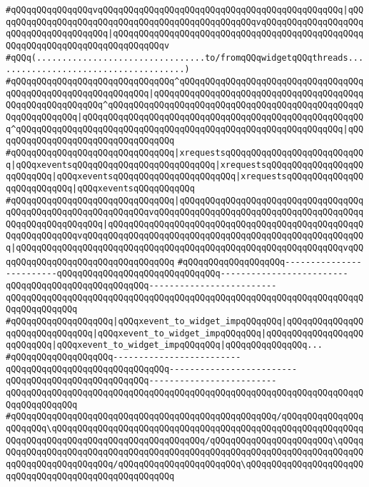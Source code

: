 \verb|#qQQqqQQqqQQqqQQqvqQQqqQQqqQQqqQQqqQQqqQQqqQQqqQQqqQQqqQQqqQQqqQQq|\verb#|qQQqqQQqqQQqqQQqqQQqqQQqqQQqqQQqqQQqqQQqqQQqqQQqqQQqvqQQqqQQqqQQqqQQqqQQqqQQqqQQqqQQqqQQqqQQq|qQQqqQQqqQQqqQQqqQQqqQQqqQQqqQQqqQQqqQQqqQQqqQQqqQQqqQQqqQQqqQQqqQQqqQQqqQQqqQQqv#\newline
\verb|#qQQq(.................................to/fromqQQqwidgetqQQqthreads......................................)|\newline
\verb|#qQQqqQQqqQQqqQQqqQQqqQQqqQQqqQQq^qQQqqQQqqQQqqQQqqQQqqQQqqQQqqQQqqQQqqQQqqQQqqQQqqQQqqQQqqQQqqQQq|\verb#|qQQqqQQqqQQqqQQqqQQqqQQqqQQqqQQqqQQqqQQqqQQqqQQqqQQqqQQqqQQq^qQQqqQQqqQQqqQQqqQQqqQQqqQQqqQQqqQQqqQQqqQQqqQQqqQQqqQQqqQQqqQQq|qQQqqQQqqQQqqQQqqQQqqQQqqQQqqQQqqQQqqQQqqQQqqQQqqQQqqQQq^qQQqqQQqqQQqqQQqqQQqqQQqqQQqqQQqqQQqqQQqqQQqqQQqqQQqqQQqqQQqqQQq|qQQqqQQqqQQqqQQqqQQqqQQqqQQqqQQqqQQq#\newline
\verb|#qQQqqQQqqQQqqQQqqQQqqQQqqQQqqQQq|\verb#|xrequestsqQQqqQQqqQQqqQQqqQQqqQQqqQQq|qQQqxeventsqQQqqQQqqQQqqQQqqQQqqQQqqQQq|xrequestsqQQqqQQqqQQqqQQqqQQqqQQqqQQq|qQQqxeventsqQQqqQQqqQQqqQQqqQQqqQQq|xrequestsqQQqqQQqqQQqqQQqqQQqqQQqqQQq|qQQqxeventsqQQqqQQqqQQq#\newline
\verb|#qQQqqQQqqQQqqQQqqQQqqQQqqQQqqQQq|\verb#|qQQqqQQqqQQqqQQqqQQqqQQqqQQqqQQqqQQqqQQqqQQqqQQqqQQqqQQqqQQqqQQqvqQQqqQQqqQQqqQQqqQQqqQQqqQQqqQQqqQQqqQQqqQQqqQQqqQQqqQQqqQQq|qQQqqQQqqQQqqQQqqQQqqQQqqQQqqQQqqQQqqQQqqQQqqQQqqQQqqQQqqQQqqQQqvqQQqqQQqqQQqqQQqqQQqqQQqqQQqqQQqqQQqqQQqqQQqqQQqqQQqqQQq|qQQqqQQqqQQqqQQqqQQqqQQqqQQqqQQqqQQqqQQqqQQqqQQqqQQqqQQqqQQqqQQqvqQQqqQQqqQQqqQQqqQQqqQQqqQQqqQQqqQQq#\newline
\verb|#qQQqqQQqqQQqqQQqqQQq-------------------------qQQqqQQqqQQqqQQqqQQqqQQqqQQqqQQq-------------------------qQQqqQQqqQQqqQQqqQQqqQQqqQQq-------------------------qQQqqQQqqQQqqQQqqQQqqQQqqQQqqQQqqQQqqQQqqQQqqQQqqQQqqQQqqQQqqQQqqQQqqQQqqQQqqQQqqQQq|\newline
\verb|#qQQqqQQqqQQqqQQqqQQq|\verb#|qQQqxevent_to_widget_impqQQqqQQq|qQQqqQQqqQQqqQQqqQQqqQQqqQQqqQQq|qQQqxevent_to_widget_impqQQqqQQq|qQQqqQQqqQQqqQQqqQQqqQQqqQQq|qQQqxevent_to_widget_impqQQqqQQq|qQQqqQQqqQQqqQQq...#\newline
\verb|#qQQqqQQqqQQqqQQqqQQq-------------------------qQQqqQQqqQQqqQQqqQQqqQQqqQQqqQQq-------------------------qQQqqQQqqQQqqQQqqQQqqQQqqQQq-------------------------qQQqqQQqqQQqqQQqqQQqqQQqqQQqqQQqqQQqqQQqqQQqqQQqqQQqqQQqqQQqqQQqqQQqqQQqqQQqqQQqqQQq|\newline
\verb|#qQQqqQQqqQQqqQQqqQQqqQQqqQQqqQQqqQQqqQQqqQQqqQQqqQQq/qQQqqQQqqQQqqQQqqQQqqQQq\qQQqqQQqqQQqqQQqqQQqqQQqqQQqqQQqqQQqqQQqqQQqqQQqqQQqqQQqqQQqqQQqqQQqqQQqqQQqqQQqqQQqqQQqqQQqqQQqqQQq/qQQqqQQqqQQqqQQqqQQqqQQq\qQQqqQQqqQQqqQQqqQQqqQQqqQQqqQQqqQQqqQQqqQQqqQQqqQQqqQQqqQQqqQQqqQQqqQQqqQQqqQQqqQQqqQQqqQQqqQQq/qQQqqQQqqQQqqQQqqQQqqQQq\qQQqqQQqqQQqqQQqqQQqqQQqqQQqqQQqqQQqqQQqqQQqqQQqqQQqqQQq|\newline
